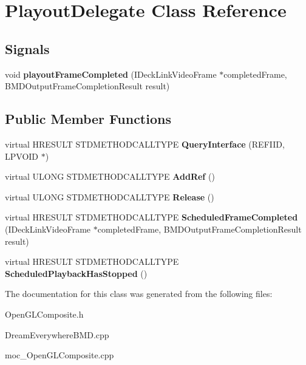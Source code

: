 \hypertarget{classPlayoutDelegate}{
\section{PlayoutDelegate Class Reference}
\label{classPlayoutDelegate}
}
\subsection*{Signals}
\begin{DoxyCompactItemize}
\item 
\hypertarget{classPlayoutDelegate_a332c5736a79fdc8222fc28d7028b83de}{
void {\bfseries playoutFrameCompleted} (IDeckLinkVideoFrame $\ast$completedFrame, BMDOutputFrameCompletionResult result)}
\label{classPlayoutDelegate_a332c5736a79fdc8222fc28d7028b83de}

\end{DoxyCompactItemize}
\subsection*{Public Member Functions}
\begin{DoxyCompactItemize}
\item 
\hypertarget{classPlayoutDelegate_a7414655cf0e673b37825cd97f187388a}{
virtual HRESULT STDMETHODCALLTYPE {\bfseries QueryInterface} (REFIID, LPVOID $\ast$)}
\label{classPlayoutDelegate_a7414655cf0e673b37825cd97f187388a}

\item 
\hypertarget{classPlayoutDelegate_af175bef8fab8330f8469295fb68fd0ea}{
virtual ULONG STDMETHODCALLTYPE {\bfseries AddRef} ()}
\label{classPlayoutDelegate_af175bef8fab8330f8469295fb68fd0ea}

\item 
\hypertarget{classPlayoutDelegate_a835091532e89964d47baa9012f6aca33}{
virtual ULONG STDMETHODCALLTYPE {\bfseries Release} ()}
\label{classPlayoutDelegate_a835091532e89964d47baa9012f6aca33}

\item 
\hypertarget{classPlayoutDelegate_abe39d5f30e540ca8b14bda5c74ed8110}{
virtual HRESULT STDMETHODCALLTYPE {\bfseries ScheduledFrameCompleted} (IDeckLinkVideoFrame $\ast$completedFrame, BMDOutputFrameCompletionResult result)}
\label{classPlayoutDelegate_abe39d5f30e540ca8b14bda5c74ed8110}

\item 
\hypertarget{classPlayoutDelegate_a6f604d26f72c6f01d1dd5a7eb84dbd78}{
virtual HRESULT STDMETHODCALLTYPE {\bfseries ScheduledPlaybackHasStopped} ()}
\label{classPlayoutDelegate_a6f604d26f72c6f01d1dd5a7eb84dbd78}

\end{DoxyCompactItemize}


The documentation for this class was generated from the following files:\begin{DoxyCompactItemize}
\item 
OpenGLComposite.h\item 
DreamEverywhereBMD.cpp\item 
moc\_\-OpenGLComposite.cpp\end{DoxyCompactItemize}

